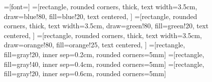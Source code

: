 \begin{figure}[htbp]
\begin{center}
=[font=\footnotesize]
=[rectangle, rounded corners,
                                    thick,
                                    text width=3.5cm,
                                    draw=blue!80,
                                    fill=blue!20,
                                    text centered,
                                    ]
=[rectangle, rounded corners,
                                    thick,
                                    text width=3.5cm,
                                    draw=green!80,
                                    fill=green!20,
                                    text centered,
                                    ]
=[rectangle, rounded corners,
                                                thick,
                                                text width=3.5cm,
                                                draw=orange!80,
                                                fill=orange!25,
                                                text centered,
]
=[rectangle,
                                                fill=gray!20,
                                                inner sep=0.2cm,
                                                rounded corners=5mm]
=[rectangle,
                                                fill=gray!40,
                                                inner sep=0.4cm,
                                                rounded corners=5mm]
=[rectangle,
                                                fill=gray!20,
                                                inner sep=0.6cm,
                                                rounded corners=5mm]

\end{center}
\end{figure}

